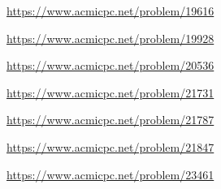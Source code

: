 \begin{problem} \url{https://www.acmicpc.net/problem/19616} \end{problem}
\begin{problem} \url{https://www.acmicpc.net/problem/19928} \end{problem}
\begin{problem} \url{https://www.acmicpc.net/problem/20536} \end{problem}
\begin{problem} \url{https://www.acmicpc.net/problem/21731} \end{problem}
\begin{problem} \url{https://www.acmicpc.net/problem/21787} \end{problem}
\begin{problem} \url{https://www.acmicpc.net/problem/21847} \end{problem}
\begin{problem} \url{https://www.acmicpc.net/problem/23461} \end{problem}